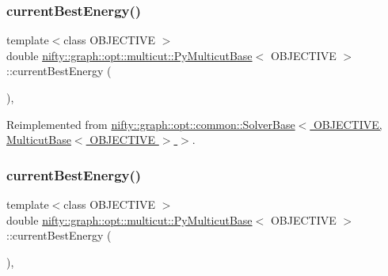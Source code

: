 \subsubsection{\texorpdfstring{current\+Best\+Energy()}{currentBestEnergy()}\hspace{0.1cm}{\footnotesize\ttfamily [1/2]}}
{\footnotesize\ttfamily template$<$class O\+B\+J\+E\+C\+T\+I\+VE $>$ \\
double \hyperlink{classnifty_1_1graph_1_1opt_1_1multicut_1_1PyMulticutBase}{nifty\+::graph\+::opt\+::multicut\+::\+Py\+Multicut\+Base}$<$ O\+B\+J\+E\+C\+T\+I\+VE $>$\+::current\+Best\+Energy (\begin{DoxyParamCaption}{ }\end{DoxyParamCaption})\hspace{0.3cm}{\ttfamily [inline]}, {\ttfamily [virtual]}}



Reimplemented from \hyperlink{classnifty_1_1graph_1_1opt_1_1common_1_1SolverBase_a871de6574e6189a0c97c0b2121b07155}{nifty\+::graph\+::opt\+::common\+::\+Solver\+Base$<$ O\+B\+J\+E\+C\+T\+I\+V\+E, Multicut\+Base$<$ O\+B\+J\+E\+C\+T\+I\+V\+E $>$ $>$}.

\mbox{\label{classnifty_1_1graph_1_1opt_1_1multicut_1_1PyMulticutBase_a0928f8539f5773900cefe88d703c14eb}} 
\subsubsection{\texorpdfstring{current\+Best\+Energy()}{currentBestEnergy()}\hspace{0.1cm}{\footnotesize\ttfamily [2/2]}}
{\footnotesize\ttfamily template$<$class O\+B\+J\+E\+C\+T\+I\+VE $>$ \\
double \hyperlink{classnifty_1_1graph_1_1opt_1_1multicut_1_1PyMulticutBase}{nifty\+::graph\+::opt\+::multicut\+::\+Py\+Multicut\+Base}$<$ O\+B\+J\+E\+C\+T\+I\+VE $>$\+::current\+Best\+Energy (\begin{DoxyParamCaption}{ }\end{DoxyParamCaption})\hspace{0.3cm}{\ttfamily [inline]}, {\ttfamily [virtual]}}



